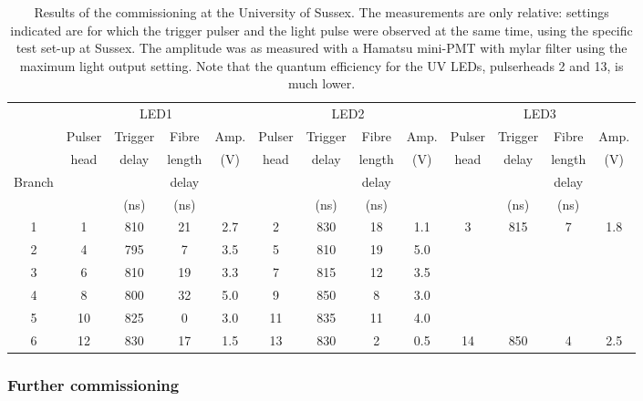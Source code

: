 \begin{table}[h!]
  \begin{center}
    \caption{Results of the commissioning at the University of Sussex. The measurements are only relative: settings indicated are for which the trigger pulser and the light pulse were observed at the same time, using the specific test set-up at Sussex. The amplitude was as measured with a Hamatsu mini-PMT with mylar filter using the maximum light output setting. Note that the quantum efficiency for the UV LEDs, pulserheads 2 and 13, is much lower.}
    \label{table:sussex_commissioning}
    \begin{tabular}{|c|c|c|c|c|c|c|c|c|c|c|c|c|} 
	\hline
	 & \multicolumn{4}{c|}{LED1} & \multicolumn{4}{c|}{LED2} & \multicolumn{4}{c|}{LED3} \\
	\cline{2-13}
		        & Pulser & Trigger  & Fibre  & Amp.
		        & Pulser & Trigger  & Fibre  & Amp.
		        & Pulser & Trigger  & Fibre  & Amp. \\
	              & head    & delay & length & (V) 
			 & head    & delay & length & (V) 
                    & head    & delay & length & (V) \\
	Branch    & & & delay & & & & delay & & & & delay & \\
	             & & (ns) & (ns) & & & (ns) & (ns) & & & (ns) & (ns) & \\
       \hline 
	1 & 1 & 810 & 21 & 2.7 & 2 & 830 & 18 & 1.1 & 3 & 815 & 7 & 1.8 \\
	2 & 4 & 795 & 7  & 3.5 & 5 & 810 & 19 & 5.0 & & & & \\
	3 & 6 & 810 & 19 & 3.3 & 7 & 815 & 12 & 3.5 & & & & \\
	4 & 8 & 800 & 32 & 5.0 & 9 & 850 & 8 & 3.0 & & & & \\
	5 & 10 & 825 & 0 & 3.0 & 11 & 835 & 11 & 4.0 & & & & \\
	6 & 12 & 830 & 17 & 1.5 & 13 & 830 & 2 & 0.5 & 14 & 850 & 4 & 2.5 \\
	\hline
    \end{tabular}
  \end{center}
\end{table}

\subsubsection*{Further commissioning}

